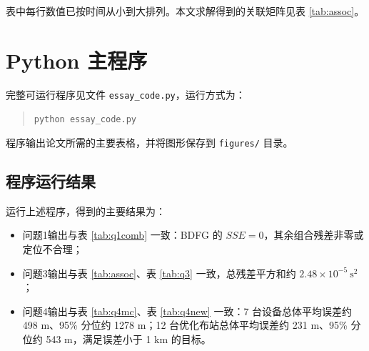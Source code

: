 \documentclass[12pt,a4paper]{article}
\begin{document}
表中每行数值已按时间从小到大排列。本文求解得到的关联矩阵见表 \ref{tab:assoc}。




\section{Python 主程序}

完整可运行程序见文件 \texttt{essay\_code.py}，运行方式为：
\begin{quote}\texttt{python essay\_code.py}\end{quote}
程序输出论文所需的主要表格，并将图形保存到 \texttt{figures/} 目录。



\subsection{程序运行结果}

运行上述程序，得到的主要结果为：


\begin{itemize}
  \item 问题1输出与表 \ref{tab:q1comb} 一致：BDFG 的 $SSE=0$，其余组合残差非零或定位不合理；
  \item 问题3输出与表 \ref{tab:assoc}、表 \ref{tab:q3} 一致，总残差平方和约 $2.48\times10^{-5}\ \mathrm{s^2}$；
  \item 问题4输出与表 \ref{tab:q4mc}、表 \ref{tab:q4new} 一致：7 台设备总体平均误差约 498 m、95\% 分位约 1278 m；12 台优化布站总体平均误差约 231 m、95\% 分位约 543 m，满足误差小于 1 km 的目标。
\end{itemize}
\end{document}
